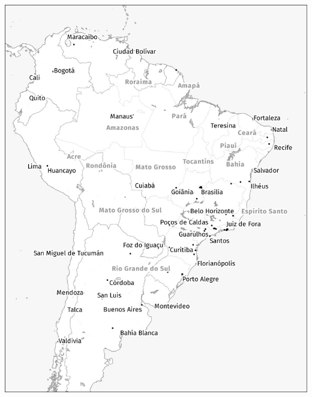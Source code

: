 \begin{minipage}{\textwidth} \includegraphics[width=\textwidth]{maps/Ameriko-suda.jpg} \end{minipage}
